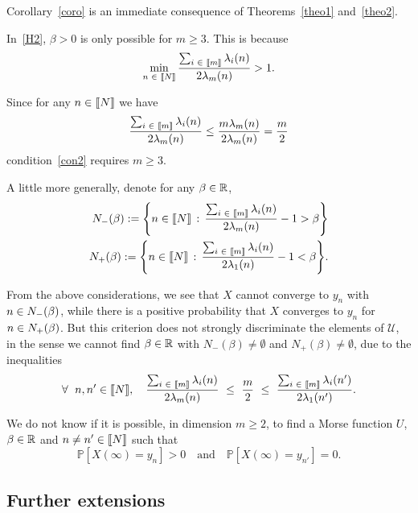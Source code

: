 \documentclass[AHL,Unicode,longabstracts,published]{cedram}
\newcommand{\f}[2]{\frac{#1}{#2}}
\newcommand{\cU}{\mathcal{U}}
\newcommand{\PP}{\mathbb{P}}
\newcommand{\RR}{\mathbb{R}}
\newcommand{\iy}{\infty}
\newcommand{\fo}{\forall\ }
\let\originalleft\left
\let\originalright\right
\renewcommand{\left}{\mathopen{}\mathclose\bgroup\originalleft}
\renewcommand{\right}{\aftergroup\egroup\originalright}
\let\oldin\in
\renewcommand{\in}{\mathchoice{\oldin}{\oldin}{\,\oldin\,}{\,\oldin\,}}
\let\oldforall\forall
\renewcommand*{\forall}{\mathrel{\oldforall}}
\newcommand{\llbracket}{\mathopen{[\mkern -2.7mu[}}
\newcommand{\rrbracket}{\mathclose{]\mkern -2.7mu]}}
\newcommand{\lin}{\llbracket}
\newcommand{\rin}{\rrbracket}
\begin{document}
Corollary~\ref{coro} is an immediate consequence of Theorems~\ref{theo1} and~\ref{theo2}.
\begin{rema}
In~\eqref{H2}, $\beta>0$ is only possible for $m\geq 3$. This is because
\begin{equation}\label{con2}
\min_{n\in\lin N\rin}\f{\sum_{i\in\lin m\rin}\lambda_i(n)}{2\lambda_m(n)} > 1.
\end{equation}

Since for any $n\in\lin N\rin$ we have
\begin{align*}
\f{\sum_{i\in\lin m\rin}\lambda_i(n)}{2\lambda_m(n)} \leq \f{m\lambda_m(n)}{2\lambda_m(n)} = \f{m}{2}
\end{align*}
condition~\eqref{con2} requires $m\geq 3$.
\end{rema}
A little more generally, denote for any $\beta\in\RR$,
\begin{align*}
N_-(\beta) := \left\{n\in\lin N\rin\,:\, \f{\sum_{i\in\lin m\rin}\lambda_i(n)}{2\lambda_m(n)}-1>\beta\right\}\\
N_+(\beta) := \left\{n\in\lin N\rin\,:\, \f{\sum_{i\in\lin m\rin}\lambda_i(n)}{2\lambda_1(n)}-1<\beta\right\}.
\end{align*}


From the above considerations, we see that $X$ cannot converge to $y_n$ with $n\in N_-(\beta)$, while there is a positive probability that $X$ converges to $y_n$ for $n\in N_+(\beta)$. But this criterion does not strongly discriminate the elements of $\cU$, in the sense we cannot find $\beta\in\RR$ with $N_-(\beta)\neq\emptyset$ and $N_+(\beta)\neq\emptyset$, due to the inequalities
\begin{equation*}
\fo n,n'\in\lin N\rin,\quad\f{\sum_{i\in\lin m\rin}\lambda_i(n)}{2\lambda_m(n)}\ \leq \ \f{m}2\ \leq \ \f{\sum_{i\in\lin m\rin}\lambda_i(n')}{2\lambda_1(n')}.
\end{equation*}


We do not know if it is possible, in dimension $m\geq 2$, to find a Morse function $U$, $\beta\in\RR$ and $n\neq n'\in\lin N\rin$ such that
\begin{equation*}
\PP[X(\iy)=y_n]>0\quad \text{and}\quad \PP[X(\iy)=y_{n'}]=0.
\end{equation*}



\subsection{Further extensions}
\end{document}
